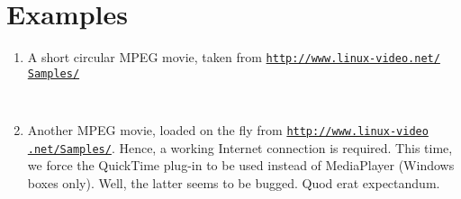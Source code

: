 \documentclass[a4paper]{article}
\begin{document}
\section{Examples}\label{examples}
\begin{enumerate}
\item A short circular MPEG movie, taken from \href{http://www.linux-video.net/Samples/}{\tt http://www.linux-video.net/} \href{http://www.linux-video.net/Samples/}{\tt Samples/}

\begin{minipage}{0.5\linewidth}
{\tt%
  \string{}\string{\\
  \phantom{xx}.5\string\linewidth\\
  \string}\string{\\
  \phantom{xx}.375\string\linewidth\\
  \string}
}
\end{minipage}%
\begin{minipage}{0.5\linewidth}
\begin{center}
\end{center}
\end{minipage}

\item Another MPEG movie, loaded on the fly from \href{http://www.linux-video.net/Samples/}{\tt http://www.linux-video} \href{http://www.linux-video.net/Samples/}{\tt .net/Samples/}. Hence, a working Internet connection is required. This time, we force the QuickTime plug-in to be used instead of MediaPlayer (Windows boxes only). Well, the latter seems to be bugged. Quod erat expectandum.


\end{enumerate}
\end{document}
